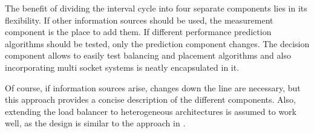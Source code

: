 The benefit of dividing the interval cycle into four separate components lies
in its flexibility.
If other information sources should be used, the measurement component is the
place to add them.
If different performance prediction algorithms should be tested, only the
prediction component changes.
The decision component allows to easily test balancing and placement algorithms
and also incorporating multi socket systems is neatly encapsulated in it.

Of course, if information sources arise, changes down the line are necessary,
but this approach provides a concise description of the different components.
Also, extending the load balancer to heterogeneous architectures is assumed to
work well, as the design is similar to the approach in
\cite{sarma_smartbalance_2015}.


\begin{comment}

\paragraph{Topology description}
Represents the cache and core layout of the CPU.
On Haswell it consist of a package description containing core descriptions.
A core description consists of the hardware assigned APIC\_id, the kernel
assigned fiasco\_id, and the SMT abstraction.
It can be expanded to include multi-socket systems by adding more package
descriptions.
It maps the fiasco view on the cores onto the actual HW topology and uses CPUID
to determine corresponding logical cores.

\paragraph{Thread\_t}
is the administrative representation of a L4-thread.
It contains not only of the thread parameters passed via run\_thread(), but
also measurements for the current and last interval.
LLC-misses, execution time, an identifier, and the cores it currently runs on
and will run on in the next interval.

\end{comment}
